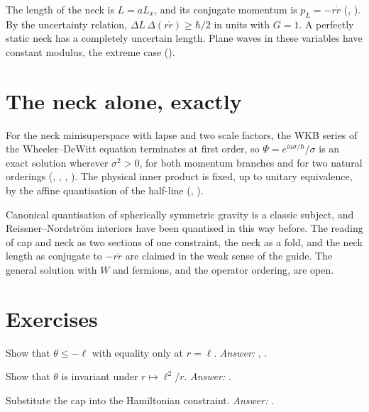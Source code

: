 The length of the neck is $L=aL_x$, and its conjugate momentum is $p_L=-r\dot r$ (, ). By the uncertainty relation, $\Delta L\,\Delta(r\dot r)\ge\hbar/2$ in units with $G=1$. A perfectly static neck has a completely uncertain length. Plane waves in these variables have constant modulus, the extreme case ().

\section{The neck alone, exactly}

For the neck minisuperspace with lapse and two scale factors, the WKB series of the Wheeler--DeWitt equation terminates at first order, so $\Psi=e^{ia\sigma/\hbar}/\sigma$ is an exact solution wherever $\sigma^2>0$, for both momentum branches and for two natural orderings (, , , ). The physical inner product is fixed, up to unitary equivalence, by the affine quantisation of the half-line (, ).

\begin{standsbox}
Canonical quantisation of spherically symmetric gravity is a classic subject, and Reissner--Nordstr\"om interiors have been quantised in this way before. The reading of cap and neck as two sections of one constraint, the neck as a fold, and the neck length as conjugate to $-r\dot r$ are claimed in the weak sense of the guide. The general solution with $W$ and fermions, and the operator ordering, are open. \open
\end{standsbox}

\section*{Exercises}
\begin{exercise}Show that $\theta\le-\ell$ with equality only at $r=\ell$. \emph{Answer:} , .\end{exercise}
\begin{exercise}Show that $\theta$ is invariant under $r\mapsto\ell^2/r$. \emph{Answer:} .\end{exercise}
\begin{exercise}Substitute the cap into the Hamiltonian constraint. \emph{Answer:} .\end{exercise}

